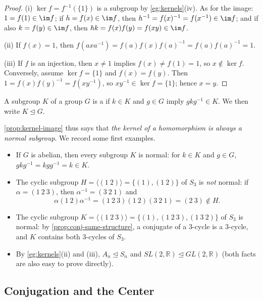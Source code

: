 \begin{proof}
	(i) \(\ker f = f^{-1}(\{1\})\) is a subgroup by \autoref{eg:kernels}(iv). As for the
	image: \(1 = f(1) \in \im f\); if \(h = f(x) \in \im f\), then
	\(h^{-1} = f(x)^{-1} = f(x^{-1}) \in \im f\); and if also \(k = f(y) \in \im f\), then
	\(hk = f(x)f(y) = f(xy) \in \im f\).

	(ii) If \(f(x) = 1\), then
	\(f(axa^{-1}) = f(a)f(x)f(a)^{-1} = f(a)f(a)^{-1} = 1\).

	(iii) If \(f\) is an injection, then \(x \neq 1\) implies \(f(x) \neq f(1) = 1\), so
	\(x \notin \ker f\). Conversely, assume \(\ker f = \{1\}\) and \(f(x) = f(y)\). Then
	\(1 = f(x)f(y)^{-1} = f(xy^{-1})\), so \(xy^{-1} \in \ker f = \{1\}\); hence
	\(x = y\).
\end{proof}

\begin{definition}\label{def:normal}
	A subgroup \(K\) of a group \(G\) is a  if \(k \in K\) and
	\(g \in G\) imply \(gkg^{-1} \in K\). We then write \(K \trianglelefteq G\).
\end{definition}

\autoref{prop:kernel-image} thus says that \emph{the kernel of a homomorphism is always a
	normal subgroup}. We record some first examples.
\begin{itemize}
	\item If \(G\) is abelian, then every subgroup \(K\) is normal: for \(k \in K\) and
	      \(g \in G\), \(gkg^{-1} = kgg^{-1} = k \in K\).
	\item The cyclic subgroup \(H = \langle(1\ 2)\rangle = \{(1), (1\ 2)\}\) of \(S_3\) is
	      \emph{not} normal: if \(\alpha = (1\ 2\ 3)\), then \(\alpha^{-1} = (3\ 2\ 1)\) and
	      \[
		      \alpha(1\ 2)\alpha^{-1} = (1\ 2\ 3)(1\ 2)(3\ 2\ 1) = (2\ 3) \notin H.
	      \]
	\item The cyclic subgroup \(K = \langle(1\ 2\ 3)\rangle = \{(1), (1\ 2\ 3), (1\ 3\ 2)\}\)
	      of \(S_3\) is normal: by \autoref{prop:conj-same-structure}, a conjugate of a
	      \(3\)-cycle is a \(3\)-cycle, and \(K\) contains both \(3\)-cycles of \(S_3\).
	\item By \autoref{eg:kernels}(ii) and (iii), \(A_n \trianglelefteq S_n\) and
	      \(SL(2,\mathbb R) \trianglelefteq GL(2,\mathbb R)\) (both facts are also easy to
	      prove directly).
\end{itemize}

\subsection{Conjugation and the Center}

